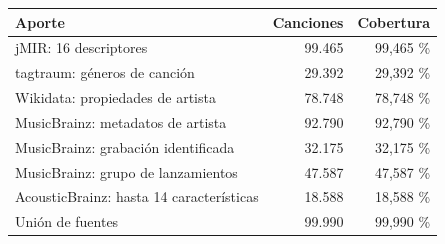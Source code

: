 \begin{center}\small
{}\label{tab:cobertura}
\begin{tabularx}{\linewidth}{@{}Y r r@{}}
\toprule
\textbf{Aporte} & \textbf{Canciones} & \textbf{Cobertura} \\
\midrule
jMIR: 16 descriptores & 99.465 & 99,465 \% \\
tagtraum: géneros de canción & 29.392 & 29,392 \% \\
Wikidata: propiedades de artista & 78.748 & 78,748 \% \\
MusicBrainz: metadatos de artista & 92.790 & 92,790 \% \\
MusicBrainz: grabación identificada & 32.175 & 32,175 \% \\
MusicBrainz: grupo de lanzamientos & 47.587 & 47,587 \% \\
AcousticBrainz: hasta 14 características & 18.588 & 18,588 \% \\
Unión de fuentes & 99.990 & 99,990 \% \\
\bottomrule
\end{tabularx}
\end{center}
